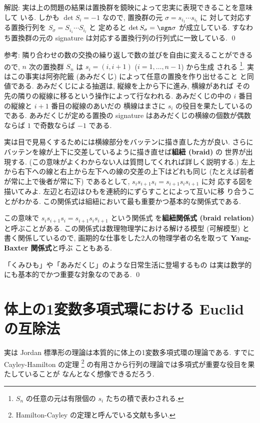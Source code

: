 \documentclass[12pt,twoside]{jarticle}
\begin{document}
\medskip
\noindent
解説: 実は上の問題の結果は置換群を鏡映によって忠実に表現できることを意味して
いる.  しかも $\det S_i=-1$ なので, 
置換群の元 $\sigma=s_{i_1}\cdots s_{i_l}$ に
対して対応する置換行列を $S_{\sigma} = S_{i_1}\cdots S_{i_l}$ と
定めると $\det S_{\sigma} = \sgn\sigma$ が成立している.
すなわち置換群の元の signature は対応する置換行列の行列式に一致している.
\qed

\medskip
\noindent
参考: 隣り合わせの数の交換の繰り返しで数の並びを自由に変えることができる
ので, $n$ 次の置換群 $S_n$ は $s_i=(i,i+1)$ ($i=1,\dots,n-1$) から生成
される%
\footnote{$S_n$ の任意の元は有限個の $s_i$ たちの積で表わされる.}.  
実はこの事実は阿弥陀籤 (あみだくじ) によって任意の置換を作り出せること
と同値である.  あみだくじによる抽選は, 縦線を上から下に進み, 横線があれば
その先の隣りの縦線に移るという操作によって行なわれる.
あみだくじの中の $i$ 番目の縦線と $i+1$ 番目の縦線のあいだの
横線はまさに $s_i$ の役目を果たしているのである.
あみだくじが定める置換の signature はあみだくじの横線の個数が偶数
ならば $1$ で奇数ならば $-1$ である.

実は目で見易くするためには横線部分をバッテンに描き直した方が良い.
さらにバッテンを線が上下に交差しているように描き直せば{\bf 組紐 (braid)} の
世界が出現する.  
(この意味がよくわからない人は質問してくれれば詳しく説明する.)
左上から右下への線と右上から左下への線の交差の上下はどれも同じ (たとえば前者
が常に上で後者が常に下) であるとして, $s_is_{i+1}s_i=s_{i+1}s_is_{i+1}$ に対
応する図を描いてみよ.  左辺と右辺はひもを連続的にずらすことによって互いに移
り合うことがわかる.  
この関係式は組紐において最も重要かつ基本的な関係式である.  

この意味で $s_is_{i+1}s_i=s_{i+1}s_is_{i+1}$ という関係式
を{\bf 組紐関係式 (braid relation)} と呼ぶことがある. 
この関係式は数理物理学における解ける模型 (可解模型) と書く関係しているので, 
画期的な仕事をした2人の物理学者の名を取って {\bf Yang-Baxter 関係式}と呼ぶ
こともある.

「くみひも」や「あみだくじ」のような日常生活に登場するもの
は実は数学的にも基本的でかつ重要な対象なのである.
\qed


\section{体上の1変数多項式環における Euclid の互除法}
\label{sec:Euclidean-algorithm-K[x]}

実は Jordan 標準形の理論は本質的に体上の1変数多項式環の理論である.
すでに Cayley-Hamilton の定理%
\footnote{Hamilton-Cayley の定理と呼んでいる文献も多い.}
の有用さから行列の理論では多項式が重要な役目を果たしていることが
なんとなく想像できるだろう. 
\end{document}
